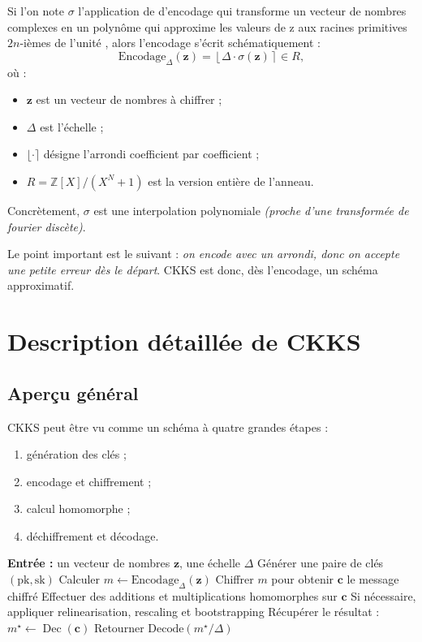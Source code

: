 \documentclass[11pt,a4paper]{article}
\begin{document}
Si l'on note $\sigma$ l'application de d'encodage qui transforme un vecteur de nombres complexes en un polynôme qui approxime les valeurs de z aux racines
primitives $2n$-ièmes de l'unité , alors l'encodage s'écrit schématiquement :
\[
\mathrm{Encodage}_\Delta(\mathbf{z})
=
\left\lfloor \Delta \cdot \sigma(\mathbf{z}) \right\rceil \in R,
\]
où :
\begin{itemize}[leftmargin=2em]
  \item $\mathbf{z}$ est un vecteur de nombres à chiffrer ;
  \item $\Delta$ est l'échelle ;
  \item $\lfloor \cdot \rceil$ désigne l'arrondi coefficient par coefficient ;
  \item $R=\mathbb{Z}[X]/(X^N+1)$ est la version entière de l'anneau.
\end{itemize}

Concrètement, $\sigma$ est une interpolation polynomiale \emph{(proche d'une transformée de fourier discète)}.

Le point important est le suivant : \emph{on encode avec un arrondi, donc on accepte une petite erreur dès le départ}. CKKS est donc, dès l'encodage, un schéma approximatif.

\section{Description détaillée de CKKS}

\subsection{Aperçu général}

CKKS peut être vu comme un schéma à quatre grandes étapes :
\begin{enumerate}[leftmargin=2em]
  \item génération des clés ;
  \item encodage et chiffrement ;
  \item calcul homomorphe ;
  \item déchiffrement et décodage.
\end{enumerate}

\begin{algorithm}[htbp]
\caption{Version simplifiée de CKKS}
\begin{algorithmic}[1]
\State \textbf{Entrée :} un vecteur de nombres $\mathbf{z}$, une échelle $\Delta$
\State Générer une paire de clés $(\text{pk},\text{sk})$
\State Calculer $m \leftarrow \mathrm{Encodage}_\Delta(\mathbf{z})$
\State Chiffrer $m$ pour obtenir $\mathbf{c}$ le message chiffré
\State Effectuer des additions et multiplications homomorphes sur $\mathbf{c}$
\State Si nécessaire, appliquer relinearisation, rescaling et bootstrapping
\State Récupérer le résultat : $m^\star \leftarrow \operatorname{Dec}(\mathbf{c})$
\State Retourner $\mathrm{Decode}(m^\star/\Delta)$
\end{algorithmic}
\end{algorithm}
\end{document}
